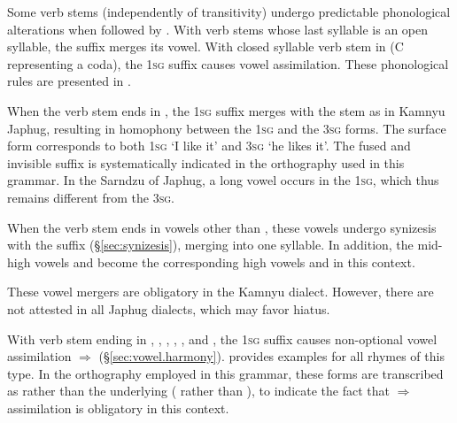  Some verb stems (independently of transitivity) undergo predictable phonological alterations when followed by . With verb stems whose last syllable is an open syllable,  the  suffix merges its vowel. With closed syllable verb stem in  (C representing a coda), the \textsc{1sg} suffix causes vowel assimilation. These phonological rules are presented in .

When the verb stem ends in , the \textsc{1sg} suffix merges with the stem as  in Kamnyu Japhug, resulting in homophony between the \textsc{1sg} and the \textsc{3sg} forms. The surface form  corresponds to both \textsc{1sg}  `I like it' and \textsc{3sg}  `he likes it'. The fused and invisible suffix is systematically indicated in the orthography used in this grammar. In the Sarndzu of Japhug, a long vowel occurs in the \textsc{1sg}, which thus remains different from the \textsc{3sg}.

When the verb stem ends in vowels other than , these vowels undergo synizesis with the  suffix (§\ref{sec:synizesis}), merging into one syllable. In addition, the mid-high vowels  and  become the corresponding high vowels  and  in this context. 

These vowel mergers are obligatory in the Kamnyu dialect. However, there are not attested in all Japhug dialects, which may favor hiatus.

With verb stem ending in , , , , ,  and ,  the \textsc{1sg} suffix causes non-optional vowel assimilation  $\Rightarrow$  (§\ref{sec:vowel.harmony}).  provides examples for all rhymes of this type. In the orthography employed in this grammar, these forms are transcribed as  rather than the underlying  ( rather than ), to indicate the fact that  $\Rightarrow$  assimilation is obligatory in this context.

